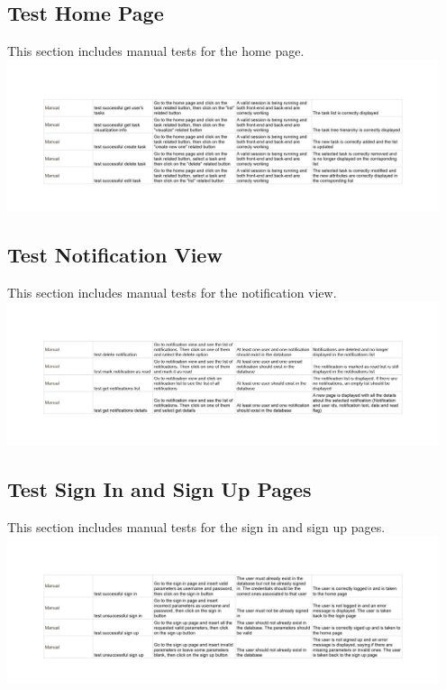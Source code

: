 \documentclass{article}
\begin{document}
\subsection*{Test Home Page}
This section includes manual tests for the home page.
\newline
\includegraphics[width=0.95\textwidth]{images/Test_HomePage.jpg}

\subsection*{Test Notification View}
This section includes manual tests for the notification view.
\newline
\includegraphics[width=0.95\textwidth]{images/Test_NotificationView.jpg}

\subsection*{Test Sign In and Sign Up Pages}
This section includes manual tests for the sign in and sign up pages.
\newline
\includegraphics[width=0.95\textwidth]{images/Test_SignInSignUpPage.jpg}
\end{document}
